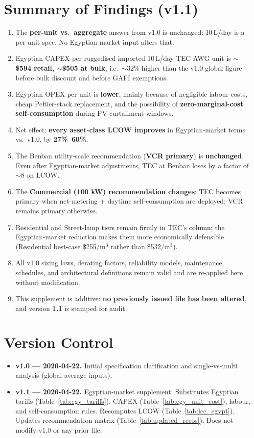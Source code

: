\documentclass[11pt,a4paper]{article}
\begin{document}
\section{Summary of Findings (v1.1)}
\label{sec:summary_v11}
\begin{enumerate}[leftmargin=*]
  \item The \textbf{per-unit vs.\ aggregate} answer from v1.0 is unchanged: 10\,L/day is a per-unit spec. No Egyptian-market input alters that.
  \item Egyptian CAPEX per ruggedised imported 10\,L/day TEC AWG unit is \textbf{$\sim$\$594 retail, $\sim$\$505 at bulk}, i.e.\ $\sim$32\% higher than the v1.0 global figure before bulk discount and before GAFI exemptions.
  \item Egyptian OPEX per unit is \textbf{lower}, mainly because of negligible labour costs, cheap Peltier-stack replacement, and the possibility of \textbf{zero-marginal-cost self-consumption} during PV-curtailment windows.
  \item Net effect: \textbf{every asset-class LCOW improves} in Egyptian-market terms vs.\ v1.0, by \textbf{27\%--60\%}.
  \item The Benban utility-scale recommendation (\textbf{VCR primary}) is \textbf{unchanged}. Even after Egyptian-market adjustments, TEC at Benban loses by a factor of $\sim$8 on LCOW.
  \item The \textbf{Commercial (100 kW) recommendation changes}: TEC becomes primary when net-metering + daytime self-consumption are deployed; VCR remains primary otherwise.
  \item Residential and Street-lamp tiers remain firmly in TEC's column; the Egyptian-market reduction makes them more economically defensible (Residential best-case \$255/m$^3$ rather than \$532/m$^3$).
  \item All v1.0 sizing laws, derating factors, reliability models, maintenance schedules, and architectural definitions remain valid and are re-applied here without modification.
  \item This supplement is additive: \textbf{no previously issued file has been altered}, and version \textbf{1.1} is stamped for audit.
\end{enumerate}

\section*{Version Control}
\begin{itemize}[leftmargin=*]
  \item \textbf{v1.0 --- 2026-04-22.} Initial specification clarification and single-vs-multi analysis (global-average inputs).
  \item \textbf{v1.1 --- 2026-04-22.} Egyptian-market supplement. Substitutes Egyptian tariffs (Table~\ref{tab:egy_tariffs}), CAPEX (Table~\ref{tab:egy_unit_cost}), labour, and self-consumption rules. Recomputes LCOW (Table~\ref{tab:lcc_egypt}). Updates recommendation matrix (Table~\ref{tab:updated_recos}). Does not modify v1.0 or any prior file.
\end{itemize}
\end{document}
